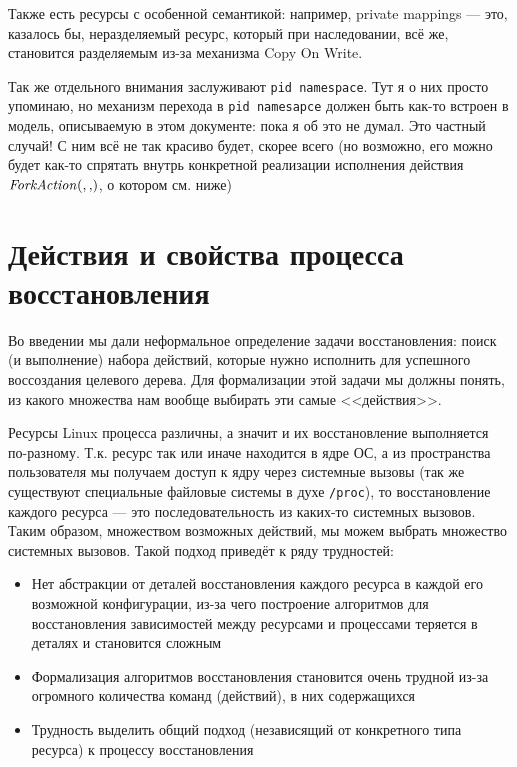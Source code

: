 Также есть ресурсы с особенной семантикой: например, private mappings --- это, казалось бы, неразделяемый ресурс, который при наследовании, всё же, становится разделяемым из-за механизма Copy On Write.

\begin{note}
Так же отдельного внимания заслуживают \texttt{pid namespace}. Тут я о них просто упоминаю, но механизм перехода в \texttt{pid namesapce} должен быть как-то встроен в модель, описываемую в этом документе: пока я об это не думал. Это частный случай! С ним всё не так красиво будет, скорее всего (но возможно, его можно будет как-то спрятать внутрь конкретной реализации исполнения действия $\crfork{}{}$, о котором см. ниже)
\end{note}

\section{Действия и свойства процесса восстановления}

Во введении мы дали неформальное определение задачи восстановления: поиск (и выполнение) набора действий, которые нужно исполнить для успешного воссоздания целевого дерева. Для формализации этой задачи мы должны понять, из какого множества нам вообще выбирать эти самые <<действия>>.

Ресурсы Linux процесса различны, а значит и их восстановление выполняется по-разному. Т.к. ресурс так или иначе находится в ядре ОС, а из пространства пользователя мы получаем доступ к ядру через системные вызовы (так же существуют специальные файловые системы в духе \texttt{/proc}), то восстановление каждого ресурса --- это последовательность из каких-то системных вызовов. Таким образом, множеством возможных действий, мы можем выбрать множество системных вызовов. Такой подход приведёт к ряду трудностей:
\begin{itemize}
	\item Нет абстракции от деталей восстановления каждого ресурса в каждой его возможной конфигурации, из-за чего построение алгоритмов для восстановления зависимостей между ресурсами и процессами теряется в деталях и становится сложным
	\item Формализация алгоритмов восстановления становится очень трудной из-за огромного количества команд (действий), в них содержащихся
	\item Трудность выделить общий подход (независящий от конкретного типа ресурса) к процессу восстановления
\end{itemize}

